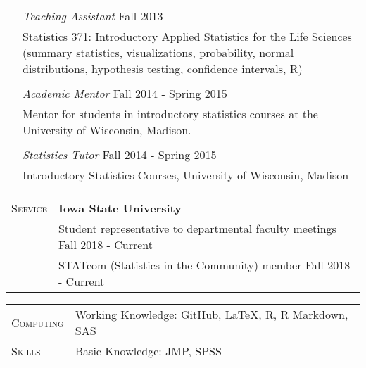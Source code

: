 \documentclass[11pt, oneside]{article}
\begin{document}
\begin{longtable}{p{3cm}p{14cm}}
\\
& \emph{Teaching Assistant} \hfill{Fall 2013}\\
& Statistics 371: Introductory Applied Statistics for the Life Sciences (summary statistics, visualizations, probability, normal distributions, hypothesis testing, confidence intervals, R)\\
\\
& \emph{Academic Mentor} \hfill{Fall 2014 - Spring 2015}\\
& Mentor for students in introductory statistics courses at the University of Wisconsin, Madison.\\
\\
& \emph{Statistics Tutor} \hfill{Fall 2014 - Spring 2015}\\
& Introductory Statistics Courses, University of Wisconsin, Madison
\end{longtable}

\vspace{0.5cm}

\noindent 
\begin{tabular}{p{3cm}p{14cm}}
\textsc{Service} & \textbf{Iowa State University} \\
& Student representative to departmental faculty meetings \hfill{Fall 2018 - Current}\\
& STATcom (Statistics in the Community) member \hfill{Fall 2018 - Current}\\
\end{tabular}


\vspace{0.5cm}

\noindent
\begin{tabular}{p{3cm}l}
\textsc{Computing} & Working Knowledge: GitHub, LaTeX, R, R Markdown, SAS\\
\textsc{Skills} & Basic Knowledge: JMP, SPSS
\end{tabular}
\end{document}
